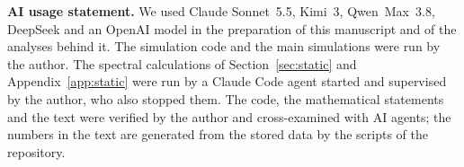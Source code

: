 \vspace{0.4em}
\begin{center}
\begin{minipage}{0.94\textwidth}
\footnotesize\noindent\textbf{AI usage statement.} We used Claude Sonnet~5.5, Kimi~3, Qwen~Max~3.8, DeepSeek and an OpenAI model in the preparation of this manuscript and of the analyses behind it. The simulation code and the main simulations were run by the author. The spectral calculations of Section~\ref{sec:static} and Appendix~\ref{app:static} were run by a Claude Code agent started and supervised by the author, who also stopped them. The code, the mathematical statements and the text were verified by the author and cross-examined with AI agents; the numbers in the text are generated from the stored data by the scripts of the repository.
\end{minipage}
\end{center}
